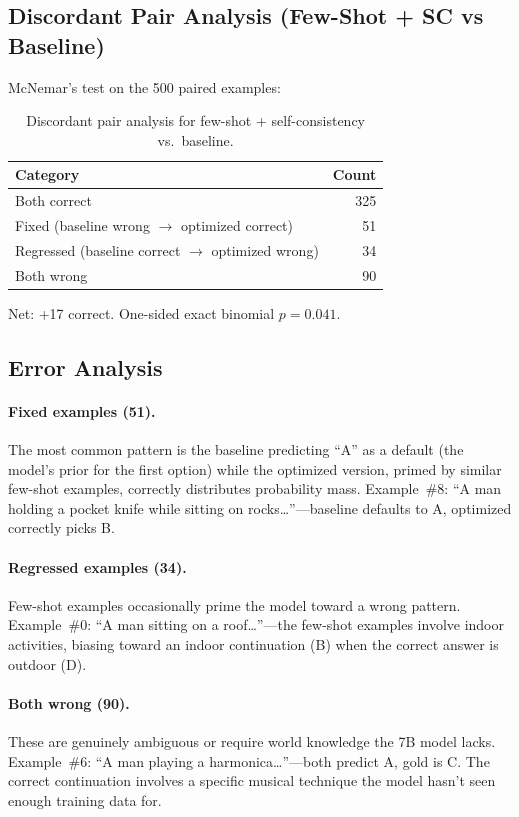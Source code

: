 \documentclass[11pt]{article}
\begin{document}
\subsection{Discordant Pair Analysis (Few-Shot + SC vs Baseline)}

McNemar's test on the 500 paired examples:

\begin{table}[h]
\centering
\begin{tabular}{@{}lr@{}}
\toprule
Category & Count \\
\midrule
Both correct & 325 \\
Fixed (baseline wrong $\to$ optimized correct) & 51 \\
Regressed (baseline correct $\to$ optimized wrong) & 34 \\
Both wrong & 90 \\
\bottomrule
\end{tabular}
\caption{Discordant pair analysis for few-shot + self-consistency vs.\ baseline.}
\label{tab:discordant}
\end{table}

Net: +17 correct. One-sided exact binomial $p = 0.041$.

\subsection{Error Analysis}

\paragraph{Fixed examples (51).} The most common pattern is the baseline predicting ``A'' as a default (the model's prior for the first option) while the optimized version, primed by similar few-shot examples, correctly distributes probability mass. Example~\#8: ``A man holding a pocket knife while sitting on rocks\ldots''---baseline defaults to A, optimized correctly picks B.

\paragraph{Regressed examples (34).} Few-shot examples occasionally prime the model toward a wrong pattern. Example~\#0: ``A man sitting on a roof\ldots''---the few-shot examples involve indoor activities, biasing toward an indoor continuation (B) when the correct answer is outdoor (D).

\paragraph{Both wrong (90).} These are genuinely ambiguous or require world knowledge the 7B model lacks. Example~\#6: ``A man playing a harmonica\ldots''---both predict A, gold is C. The correct continuation involves a specific musical technique the model hasn't seen enough training data for.
\end{document}
